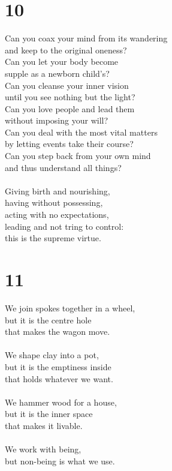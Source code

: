 \documentclass[b5paper, 12pt, oneside]{book}
\begin{document}
\chapter*{10}
Can you coax your mind from its wandering\\
and keep to the original oneness?\\
Can you let your body become\\
supple as a newborn child's?\\
Can you cleanse your inner vision\\
until you see nothing but the light?\\
Can you love people and lead them\\
without imposing your will?\\
Can you deal with the most vital matters\\
by letting events take their course?\\
Can you step back from your own mind\\
and thus understand all things?\\
\\
Giving birth and nourishing,\\
having without possessing,\\
acting with no expectations,\\
leading and not tring to control:\\
this is the supreme virtue.\\

\chapter*{11}
We join spokes together in a wheel,\\
but it is the centre hole\\
that makes the wagon move.\\
\\
We shape clay into a pot,\\
but it is the emptiness inside\\
that holds whatever we want.\\
\\
We hammer wood for a house,\\
but it is the inner space\\
that makes it livable.\\
\\
We work with being,\\
but non-being is what we use.\\
\end{document}
